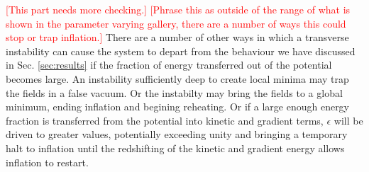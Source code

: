 \textcolor{red}{[This part needs more checking.]}
\textcolor{red}{[Phrase this as outside of the range of what is shown in the parameter varying gallery, there are a number of ways this could stop or trap inflation.]}
There are a number of other ways in which a transverse instability can cause the system to depart from the behaviour we have discussed in Sec. \ref{sec:results} if the fraction of energy transferred out of the potential becomes large.
An instability sufficiently deep to create local minima may trap the fields in a false vacuum.
Or the instabilty may bring the fields to a global minimum, ending inflation and begining reheating.
Or if a large enough energy fraction is transferred from the potential into kinetic and gradient terms, $\epsilon$ will be driven to greater values, potentially exceeding unity and bringing a temporary halt to inflation until the redshifting of the kinetic and gradient energy allows inflation to restart.


%




